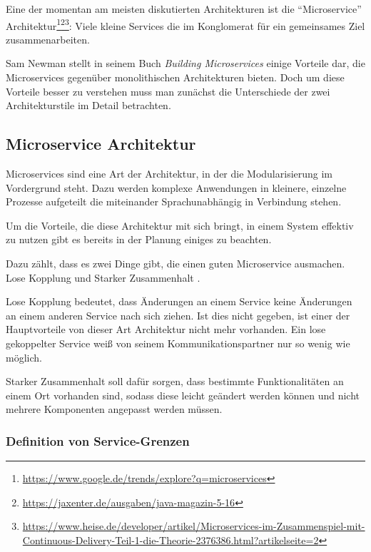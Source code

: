 \documentclass[12pt,a4paper,bibliography=totocnumbered,listof=totocnumbered]{scrartcl}
\begin{document}
Eine der momentan am meisten diskutierten Architekturen ist die \enquote{Microservice} Architektur\footnote{\url{https://www.google.de/trends/explore?q=microservices}}\footnote{\url{https://jaxenter.de/ausgaben/java-magazin-5-16}}\footnote{\url{https://www.heise.de/developer/artikel/Microservices-im-Zusammenspiel-mit-Continuous-Delivery-Teil-1-die-Theorie-2376386.html?artikelseite=2}}: Viele kleine Services die im Konglomerat für ein gemeinsames Ziel zusammenarbeiten. 


Sam Newman stellt in seinem Buch \textit{Building Microservices}\cite{buildingms} einige Vorteile dar, die Microservices gegenüber monolithischen Architekturen bieten. Doch um diese Vorteile besser zu verstehen muss man zunächst die Unterschiede der zwei Architekturstile im Detail betrachten.

\subsection{Microservice Architektur}\label{ch:ms-arch}

Microservices sind eine Art der Architektur, in der die Modularisierung im Vordergrund steht. Dazu werden komplexe Anwendungen in kleinere, einzelne Prozesse aufgeteilt die miteinander Sprachunabhängig in Verbindung stehen. \cite[S. 2-3]{wolff}

Um die Vorteile, die diese Architektur mit sich bringt, in einem System effektiv zu nutzen gibt es bereits in der Planung einiges zu beachten.

Dazu zählt, dass es zwei Dinge gibt, die einen guten Microservice ausmachen. Lose Kopplung und Starker Zusammenhalt \cite[S.62]{buildingms}.

Lose Kopplung bedeutet, dass Änderungen an einem Service keine Änderungen an einem anderen Service nach sich ziehen. Ist dies nicht gegeben, ist einer der Hauptvorteile von dieser Art Architektur nicht mehr vorhanden.
Ein lose gekoppelter Service weiß von seinem Kommunikationspartner nur so wenig wie möglich.\cite[S.63]{buildingms}

Starker Zusammenhalt soll dafür sorgen, dass bestimmte Funktionalitäten an einem Ort vorhanden sind, sodass diese leicht geändert werden können und nicht mehrere Komponenten angepasst werden müssen.\cite[S.64]{buildingms}

\subsubsection{Definition von Service-Grenzen}
\end{document}
